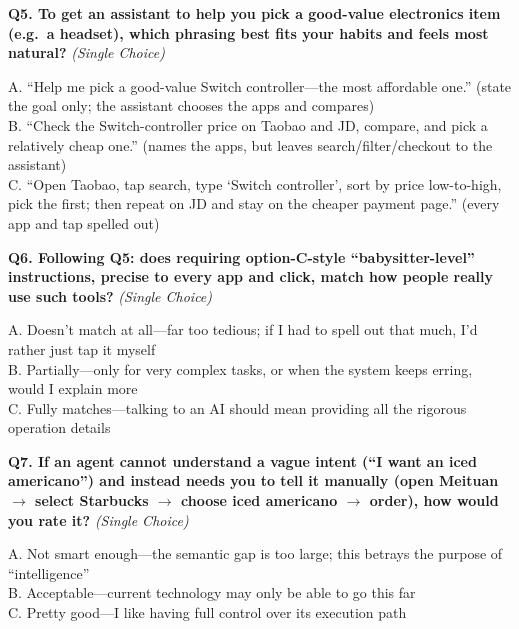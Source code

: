 \documentclass[11pt]{article}
\newcommand{\qq}[2]{\noindent\textbf{#1} {\itshape\footnotesize\color{black!55}(#2)}\par\nobreak\smallskip}
\begin{document}
\begin{mdframed}[style=qbox]
\medskip
\qq{Q5. To get an assistant to help you pick a good-value electronics item (e.g.\ a headset), which phrasing best fits your habits and feels most natural?}{Single Choice}
A. ``Help me pick a good-value Switch controller---the most affordable one.'' (state the goal only; the assistant chooses the apps and compares)\\
B. ``Check the Switch-controller price on Taobao and JD, compare, and pick a relatively cheap one.'' (names the apps, but leaves search/filter/checkout to the assistant)\\
C. ``Open Taobao, tap search, type `Switch controller', sort by price low-to-high, pick the first; then repeat on JD and stay on the cheaper payment page.'' (every app and tap spelled out)

\medskip
\qq{Q6. Following Q5: does requiring option-C-style ``babysitter-level'' instructions, precise to every app and click, match how people really use such tools?}{Single Choice}
A. Doesn't match at all---far too tedious; if I had to spell out that much, I'd rather just tap it myself\\
B. Partially---only for very complex tasks, or when the system keeps erring, would I explain more\\
C. Fully matches---talking to an AI should mean providing all the rigorous operation details

\medskip
\qq{Q7. If an agent cannot understand a vague intent (``I want an iced americano'') and instead needs you to tell it manually (open Meituan $\rightarrow$ select Starbucks $\rightarrow$ choose iced americano $\rightarrow$ order), how would you rate it?}{Single Choice}
A. Not smart enough---the semantic gap is too large; this betrays the purpose of ``intelligence''\\
B. Acceptable---current technology may only be able to go this far\\
C. Pretty good---I like having full control over its execution path
\end{mdframed}
\end{document}
